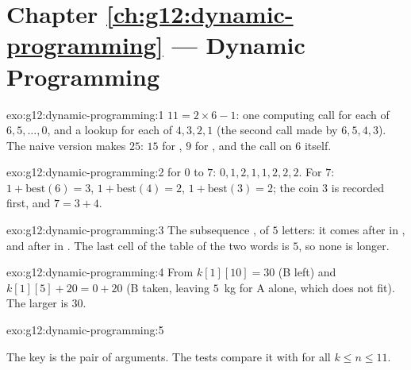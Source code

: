 \section*{Chapter \ref{ch:g12:dynamic-programming} --- Dynamic Programming}

\begin{solution}{exo:g12:dynamic-programming:1}
$11 = 2 \times 6 - 1$: one computing call for each of $6, 5, \dots, 0$, and a lookup for each of $4, 3, 2, 1$ (the
second call made by $6, 5, 4, 3$). The naive version makes $25$: $15$ for , $9$ for , and
the call on $6$ itself.
\end{solution}

\begin{solution}{exo:g12:dynamic-programming:2}
 for $0$ to $7$: $0, 1, 2, 1, 1, 2, 2, 2$. For $7$: $1 + \mathrm{best}(6) = 3$, $1 + \mathrm{best}(4) = 2$,
$1 + \mathrm{best}(3) = 2$; the coin $3$ is recorded first, and $7 = 3 + 4$.
\end{solution}

\begin{solution}{exo:g12:dynamic-programming:3}
The subsequence , of $5$ letters: it comes after  in , and after  in
. The last cell of the table of the two words is $5$, so none is longer.
\end{solution}

\begin{solution}{exo:g12:dynamic-programming:4}
From $k[1][10] = 30$ (B left) and $k[1][5] + 20 = 0 + 20$ (B taken, leaving $5$~kg for A alone, which does not fit).
The larger is $30$.
\end{solution}

\begin{solution}{exo:g12:dynamic-programming:5}
\smallskip\noindent\hspace*{2em}

\noindent\hspace*{4em}

\noindent\hspace*{6em}

\noindent\hspace*{4em}

\noindent\hspace*{6em}

\noindent\hspace*{4em}

\noindent\hspace*{6em}

\noindent\hspace*{4em}

\smallskip\noindent The key is the pair of arguments. The tests compare it with  for all
$k \le n \le 11$.
\end{solution}

